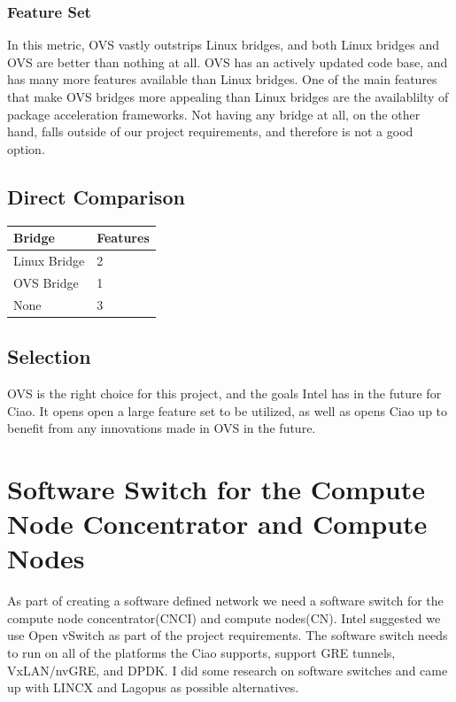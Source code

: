 \documentclass[10pt,letterpaper,onecolumn,draftclsnofoot]{IEEEtran}
\begin{document}
\subsubsection{Feature Set}
In this metric, OVS vastly outstrips Linux bridges, and both Linux bridges and
OVS are better than nothing at all. OVS has an actively updated code base, and
has many more features available than Linux bridges. \cite{ovs-linuxbridge} One
of the main features that make OVS bridges more appealing than Linux bridges are
the availablilty of package acceleration frameworks. Not having any bridge at
all, on the other hand, falls outside of our project requirements, and therefore
is not a good option.

\subsection{Direct Comparison}
\begin{center}
	\begin{tabular}{| l | l |}
		\hline
		Bridge & Features \\ \hline
		Linux Bridge & 2 \\ \hline
		OVS Bridge & 1 \\ \hline
		None & 3 \\ \hline
	\end{tabular}
\end{center}

\subsection{Selection}
OVS is the right choice for this project, and the goals Intel has in the future
for Ciao. It opens open a large feature set to be utilized, as well as opens
Ciao up to benefit from any innovations made in OVS in the future.


\section{Software Switch for the Compute Node Concentrator and Compute Nodes}
As part of creating a software defined network we need a software switch for the compute node concentrator(CNCI) and compute nodes(CN). 
Intel suggested we use Open vSwitch as part of the project requirements. 
The software switch needs to run on all of the platforms the Ciao supports, support GRE tunnels, VxLAN/nvGRE, and DPDK.
I did some research on software switches and came up with LINCX and Lagopus as possible alternatives.
\end{document}
